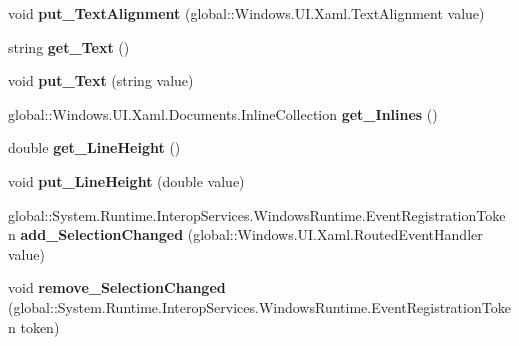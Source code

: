 \begin{DoxyCompactItemize}
void {\bfseries put\+\_\+\+Text\+Alignment} (global\+::\+Windows.\+U\+I.\+Xaml.\+Text\+Alignment value)
\item 
\mbox{\label{class_windows_1_1_u_i_1_1_xaml_1_1_controls_1_1_text_block_ae14b2c8d9da353fd995b80695d4caad0}} 
string {\bfseries get\+\_\+\+Text} ()
\item 
\mbox{\label{class_windows_1_1_u_i_1_1_xaml_1_1_controls_1_1_text_block_aa509823085f394729f1646a2acf564c4}} 
void {\bfseries put\+\_\+\+Text} (string value)
\item 
\mbox{\label{class_windows_1_1_u_i_1_1_xaml_1_1_controls_1_1_text_block_a6b2eb2ee12b7795ff5bfb850402083d6}} 
global\+::\+Windows.\+U\+I.\+Xaml.\+Documents.\+Inline\+Collection {\bfseries get\+\_\+\+Inlines} ()
\item 
\mbox{\label{class_windows_1_1_u_i_1_1_xaml_1_1_controls_1_1_text_block_a07976cf606fca5824f633f63d8da6936}} 
double {\bfseries get\+\_\+\+Line\+Height} ()
\item 
\mbox{\label{class_windows_1_1_u_i_1_1_xaml_1_1_controls_1_1_text_block_adbefe17b425b126a3b1d3598cf3b68f4}} 
void {\bfseries put\+\_\+\+Line\+Height} (double value)
\item 
\mbox{\label{class_windows_1_1_u_i_1_1_xaml_1_1_controls_1_1_text_block_af80d81341031136a13a2687720d46da0}} 
global\+::\+System.\+Runtime.\+Interop\+Services.\+Windows\+Runtime.\+Event\+Registration\+Token {\bfseries add\+\_\+\+Selection\+Changed} (global\+::\+Windows.\+U\+I.\+Xaml.\+Routed\+Event\+Handler value)
\item 
\mbox{\label{class_windows_1_1_u_i_1_1_xaml_1_1_controls_1_1_text_block_a0ec7a0aed82f465da9f07b1f0bb2f222}} 
void {\bfseries remove\+\_\+\+Selection\+Changed} (global\+::\+System.\+Runtime.\+Interop\+Services.\+Windows\+Runtime.\+Event\+Registration\+Token token)
\item 

\end{DoxyCompactItemize}
